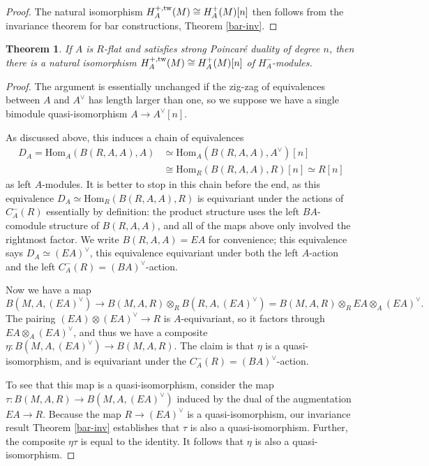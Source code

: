 \documentclass{memo-l}
\newtheorem{theorem}{Theorem}[chapter]
\theoremstyle{definition}
\theoremstyle{remark}
\numberwithin{section}{chapter}
\numberwithin{equation}{chapter}
\begin{document}
\begin{proof}
The natural isomorphism $H^{+, \textup{tw}}_A(M) \cong H^+_A(M)[n]$ then follows from the invariance theorem for bar constructions, Theorem \ref{bar-inv}.
\end{proof}

\begin{theorem}\label{PDiso}If $A$ is $R$-flat and satisfies strong Poincar\'e duality of degree $n$, then there is a natural isomorphism $H^{+,\textup{tw}}_A(M) \cong H^+_A(M)[n]$ of $H^-_A$-modules.
\end{theorem}
\begin{proof}
The argument is essentially unchanged if the zig-zag of equivalences between $A$ and $A^\vee$ has length larger than one, so we suppose we have a single bimodule quasi-isomorphism $A \to A^\vee[n]$. 

As discussed above, this induces a chain of equivalences \begin{align*}D_A = \text{Hom}_A(B(R,A,A), A) &\simeq \text{Hom}_A(B(R,A,A), A^\vee)[n] \\ &\cong \text{Hom}_R(B(R,A,A), R)[n] \simeq R[n]\end{align*} as left $A$-modules. It is better to stop in this chain before the end, as this equivalence $D_A \simeq \text{Hom}_R(B(R,A,A), R)$ is equivariant under the actions of $C^-_A(R)$ essentially by definition: the product structure uses the left $BA$-comodule structure of $B(R, A, A)$, and all of the maps above only involved the rightmost factor. We write $B(R, A, A) = EA$ for convenience; this equivalence says $D_A \simeq (EA)^\vee$, this equivalence equivariant under both the left $A$-action and the left $C^-_A(R) = (BA)^\vee$-action.

Now we have a map $$B(M, A, (EA)^\vee) \to B(M, A, R) \otimes_R B(R, A, (EA)^\vee) = B(M, A, R) \otimes_R EA \otimes_A (EA)^\vee.$$ The pairing $(EA) \otimes (EA)^\vee \to R$ is $A$-equivariant, so it factors through $EA \otimes_A (EA)^\vee$, and thus we have a composite $\eta: B(M, A, (EA)^\vee) \to B(M, A, R)$. The claim is that $\eta$ is a quasi-isomorphism, and is equivariant under the $C^-_A(R) = (BA)^\vee$-action.

To see that this map is a quasi-isomorphism, consider the map $\tau: B(M,A,R) \to B(M,A,(EA)^\vee)$ induced by the dual of the augmentation $EA \to R$. Because the map $R \to (EA)^\vee$ is a quasi-isomorphism, our invariance result Theorem \ref{bar-inv} establishes that $\tau$ is also a quasi-isomorphism. Further, the composite $\eta \tau$ is equal to the identity. It follows that $\eta$ is also a quasi-isomorphism.


\end{proof}
\end{document}
